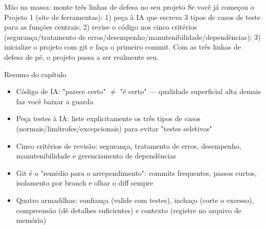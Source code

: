 \begin{tcbpractice}{Mão na massa: monte três linhas de defesa no seu projeto}
Se você já começou o Projeto 1 (site de ferramentas): 1) peça à IA que escreva 3 tipos de casos de teste para as funções centrais; 2) revise o código nos cinco critérios (segurança/tratamento de erros/desempenho/manutenibilidade/dependências); 3) inicialize o projeto com git e faça o primeiro commit. Com as três linhas de defesa de pé, o projeto passa a ser realmente seu.

\end{tcbpractice}

\begin{tcbsummary}{Resumo do capítulo}
\begin{itemize}
  \item Código de IA: "parece certo" $\neq$ "é certo" — qualidade superficial alta demais faz você baixar a guarda
  \item Peça testes à IA: liste explicitamente os três tipos de casos (normais/limítrofes/excepcionais) para evitar "testes seletivos"
  \item Cinco critérios de revisão: segurança, tratamento de erros, desempenho, manutenibilidade e gerenciamento de dependências
  \item Git é o "remédio para o arrependimento": commits frequentes, passos curtos, isolamento por branch e olhar o diff sempre
  \item Quatro armadilhas: confiança (valide com testes), inchaço (corte o excesso), compreensão (dê detalhes suficientes) e contexto (registre no arquivo de memória)
\end{itemize}

\end{tcbsummary}
